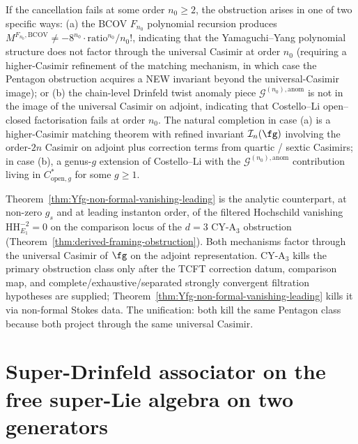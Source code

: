 \begin{remark}
\label{rem:Yfg-non-formal-higher-failure}
If the cancellation fails at some order $n_0 \geq 2$, the obstruction
arises in one of two specific ways: \textup{(a)} the BCOV $F_{n_0}$
polynomial recursion produces $M^{F_{n_0}, \mathrm{BCOV}} \neq -8^{n_0}
\cdot \mathrm{ratio}^{n_0} / n_0!$, indicating that the Yamaguchi--Yang
polynomial structure does not factor through the universal Casimir at
order $n_0$ \textup{(}requiring a higher-Casimir refinement of the
matching mechanism, in which case the Pentagon obstruction acquires a
NEW invariant beyond the universal-Casimir image\textup{);} or
\textup{(b)} the chain-level Drinfeld twist anomaly piece
$\mathcal{G}^{(n_0), \mathrm{anom}}$ is not in the image of the
universal Casimir on adjoint, indicating that Costello--Li open--closed
factorisation fails at order $n_0$. The natural completion in case (a) is
a higher-Casimir matching theorem with refined invariant
$\mathcal{I}_n(\fg)$ involving the order-$2n$ Casimir on adjoint plus
correction terms from quartic / sextic Casimirs; in case (b), a
genus-$g$ extension of Costello--Li with the
$\mathcal{G}^{(n_0), \mathrm{anom}}$ contribution living in
$C^*_{\mathrm{open}, g}$ for some $g \geq 1$.
\end{remark}

\begin{remark}
\label{rem:Yfg-non-formal-goodwillie-counterpart}
Theorem~\ref{thm:Yfg-non-formal-vanishing-leading} is the analytic
counterpart, at non-zero $g_s$ and at leading instanton order, of the
filtered Hochschild vanishing $\mathrm{HH}^{-2}_{E_1} = 0$ on the
comparison locus of the $d = 3$ CY-A$_3$ obstruction
\textup{(}Theorem~\ref{thm:derived-framing-obstruction}\textup{).}
Both mechanisms factor through the
universal Casimir of $\fg$ on the adjoint representation. CY-A$_3$ kills
the primary obstruction class only after the TCFT correction datum,
comparison map, and complete/exhaustive/separated strongly convergent
filtration hypotheses are supplied;
Theorem~\ref{thm:Yfg-non-formal-vanishing-leading} kills it via
non-formal Stokes data. The unification: both kill the same Pentagon
class because both project through the same universal Casimir.
\end{remark}

\section{Super-Drinfeld associator on the free super-Lie algebra on two generators}
\label{sec:super-drinfeld-associator}


